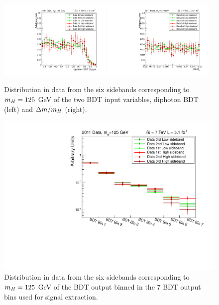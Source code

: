 \begin{figure}
 \begin{center}
  \includegraphics[width=0.48\textwidth]{hgg7TeV/sidebandMvaPlots/datasidebands_diphobdt}
  \includegraphics[width=0.48\textwidth]{hgg7TeV/sidebandMvaPlots/datasidebands_dmom}\\
 \end{center}
 \caption{Distribution in data from the six sidebands corresponding to $m_{H}=125$ GeV of the two BDT 
 input variables, diphoton BDT (left) and $\Delta m/m_{H}$ (right).}
 \label{fig:datasidebandsinput}
\end{figure}
\begin{figure}
 \begin{center}
  \includegraphics[width=.8\textwidth]{hgg7TeV/sidebandMvaPlots/datasidebands_finalbdt}
 \end{center}
 \caption{Distribution in data from the six sidebands corresponding to $m_{H}=125$ GeV of the BDT output
 binned in the 7 BDT output bins used for signal extraction.}
 \label{fig:datasidebandsoutput}
\end{figure}

